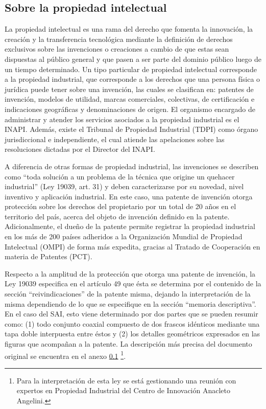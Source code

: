 \subsection{Sobre la propiedad intelectual}

La propiedad intelectual es una rama del derecho que fomenta la innovación, la creación y la transferencia tecnológica mediante la definición de derechos exclusivos sobre las invenciones o creaciones a cambio de que estas sean dispuestas al público general y que pasen a ser parte del dominio público luego de un tiempo determinado.  Un tipo particular de propiedad intelectual corresponde a la propiedad industrial, que corresponde a los derechos que una persona física o jurídica puede tener sobre una invención, las cuales se clasifican en: patentes de invención, modelos de utilidad, marcas comerciales, colectivas, de certificación e indicaciones geográficas y denominaciones de origen. El organismo encargado de administrar y atender los servicios asociados a la propiedad industrial es el INAPI. Además, existe el Tribunal de Propiedad Industrial (TDPI) como órgano jurisdiccional e independiente, el cual atiende las apelaciones sobre las resoluciones dictadas por el Director del INAPI.

A diferencia de otras formas de propiedad industrial, las invenciones se describen como “toda solución a un problema de la técnica que origine un quehacer industrial” (Ley 19039, art. 31) y deben caracterizarse por su novedad, nivel inventivo y aplicación industrial. En este caso, una patente de invención otorga protección sobre los derechos del propietario por un total de 20 años en el territorio del país, acerca del objeto de invención definido en la patente. Adicionalmente, el dueño de la patente permite registrar la propiedad industrial en los más de 200 países adheridos a la Organización Mundial de Propiedad Intelectual (OMPI) de forma más expedita, gracias al Tratado de Cooperación en materia de Patentes (PCT).

Respecto a la amplitud de la protección que otorga una patente de invención, la Ley 19039 especifica en el artículo 49 que ésta se determina por el contenido de la sección “reivindicaciones” de la patente misma, dejando la interpretación de la misma dependiendo de lo que se especifique en la sección “memoria descriptiva”. En el caso del SAI,  esto viene determinado por dos partes que se pueden resumir como: (1) todo conjunto coaxial compuesto de dos frascos idénticos mediante una tapa doble interpuesta entre éstos y (2) los detalles geométricos  expresados en las figuras que acompañan a la patente. La descripción más precisa del documento original se encuentra en el anexo \ref{} \footnote{Para la interpretación de esta ley se está gestionando una reunión con expertos en Propiedad Industrial del Centro de Innovación Anacleto Angelini.}.


